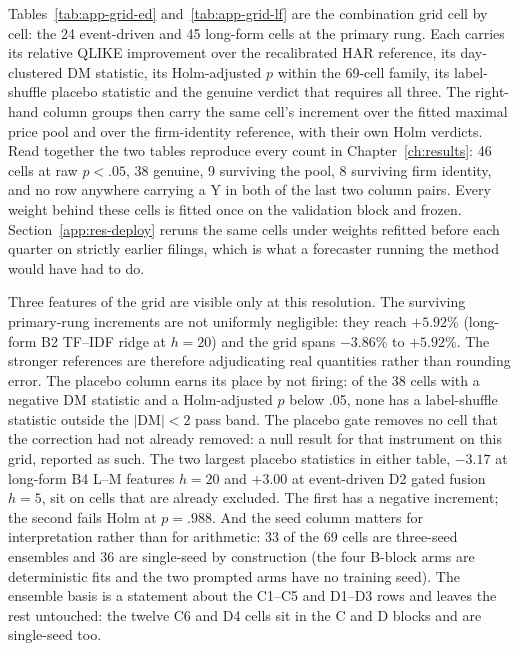 Tables~\ref{tab:app-grid-ed} and~\ref{tab:app-grid-lf} are the
combination grid cell by cell: the 24 event-driven and 45 long-form
cells at the primary rung. Each carries its relative QLIKE improvement over
the recalibrated HAR reference, its day-clustered DM statistic, its
Holm-adjusted $p$ within the 69-cell family, its label-shuffle placebo
statistic and the genuine verdict that requires all three. The right-hand
column groups then carry the same cell's increment over the fitted
maximal price pool and over the firm-identity reference, with their own
Holm verdicts. Read together the two tables reproduce every count in
Chapter~\ref{ch:results}: 46 cells at raw $p<.05$, 38 genuine, 9
surviving the pool, 8 surviving firm identity, and no row anywhere
carrying a Y in both of the last two column pairs.
Every weight behind these cells is fitted once on the validation block and
frozen. Section~\ref{app:res-deploy} reruns the same cells under weights
refitted before each quarter on strictly earlier filings, which is what a
forecaster running the method would have had to do.

Three features of the grid are visible only at this resolution. The
surviving primary-rung increments are not uniformly negligible: they
reach $+5.92\%$ (long-form B2 TF--IDF ridge at $h{=}20$) and the grid
spans $-3.86\%$ to $+5.92\%$. The stronger references are therefore
adjudicating real quantities rather than rounding error. The placebo
column earns its place by not firing: of the 38 cells with a negative DM
statistic and a Holm-adjusted $p$ below .05, none has a label-shuffle
statistic outside the $|\mathrm{DM}|<2$ pass band. The placebo gate
removes no cell that the correction had not already removed: a
null result for that instrument on this grid, reported as such. The two
largest placebo statistics in either table, $-3.17$ at long-form B4 L--M
features $h{=}20$ and $+3.00$ at event-driven D2 gated fusion $h{=}5$,
sit on cells that are already excluded. The first has a negative
increment; the second fails Holm at $p = .988$. And the
seed column matters for interpretation rather than
for arithmetic: 33 of the 69 cells are three-seed ensembles and 36 are
single-seed by construction (the four B-block arms are deterministic
fits and the two prompted arms have no training seed). The ensemble basis is a
statement about the C1--C5 and D1--D3 rows and leaves the rest untouched: the
twelve C6 and D4 cells sit in the C and D blocks and are single-seed too. %

